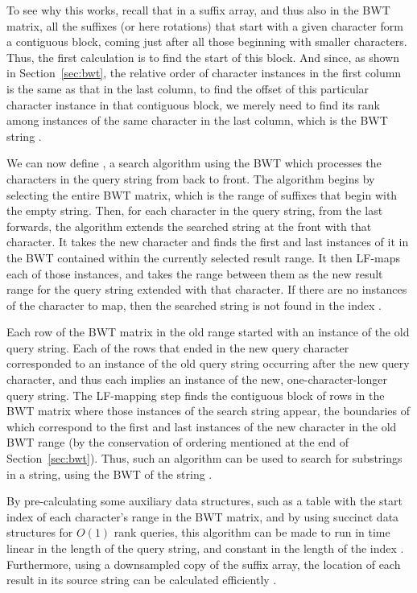 \documentclass[11pt,proposal]{ucthesis}
\begin{document}
To see why this works, recall that in a suffix array, and thus also in the BWT matrix, all the suffixes (or here rotations) that start with a given character form a contiguous block, coming just after all those beginning with smaller characters. Thus, the first calculation is to find the start of this block. And since, as shown in Section~\ref{sec:bwt}, the relative order of character instances in the first column is the same as that in the last column, to find the offset of this particular character instance in that contiguous block, we merely need to find its rank among instances of the same character in the last column, which is the BWT string \cite{langmead2013introduction}.

We can now define , a search algorithm using the BWT which processes the characters in the query string from back to front. The algorithm begins by selecting the entire BWT matrix, which is the range of suffixes that begin with the empty string. Then, for each character in the query string, from the last forwards, the algorithm extends the searched string at the front with that character. It takes the new character and finds the first and last instances of it in the BWT contained within the currently selected result range. It then LF-maps each of those instances, and takes the range between them as the new result range for the query string extended with that character. If there are no instances of the character to map, then the searched string is not found in the index \cite{ferragina2000opportunistic}.

Each row of the BWT matrix in the old range started with an instance of the old query string. Each of the rows that ended in the new query character corresponded to an instance of the old query string occurring after the new query character, and thus each implies an instance of the new, one-character-longer query string. The LF-mapping step finds the contiguous block of rows in the BWT matrix where those instances of the search string appear, the boundaries of which correspond to the first and last instances of the new character in the old BWT range (by the conservation of ordering mentioned at the end of Section~\ref{sec:bwt}). Thus, such an algorithm can be used to search for substrings in a string, using the BWT of the string \cite{ferragina2000opportunistic}.

By pre-calculating some auxiliary data structures, such as a table with the start index of each character's range in the BWT matrix, and by using succinct data structures for $O(1)$ rank queries, this algorithm can be made to run in time linear in the length of the query string, and constant in the length of the index \cite{ferragina2000opportunistic}. Furthermore, using a downsampled copy of the suffix array, the location of each result in its source string can be calculated efficiently \cite{siren2009run}.
\end{document}
